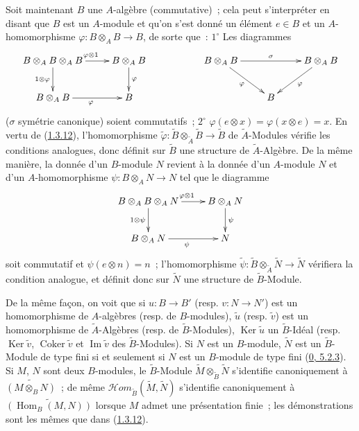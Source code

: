 \begin{env}[1.3.13]
\label{I.1.3.13-fr}
Soit maintenant $B$ une $A$-algèbre (commutative)~; cela peut s'interpréter
en disant que $B$ est un $A$-module et qu'on s'est donné un élément $e\in B$
et un $A$-homomorphisme
$\varphi:B\otimes_A B\to B$, de sorte que~: $1^\circ$ Les diagrammes
\[
  \xymatrix{
    B\otimes_A B\otimes_A B\ar[r]^{\varphi\otimes 1}
      \ar[d]_{1\otimes\varphi} &
    B\otimes_A B\ar[d]^\varphi & &
    B\otimes_A B\ar[rr]^\sigma\ar[rd]_\varphi & &
    B\otimes_A B\ar[dl]^\varphi\\
    B\otimes_A B\ar[r]_\varphi &
    B & & & B
  }
\]
($\sigma$ symétrie canonique) soient commutatifs~; $2^\circ$
$\varphi(e\otimes x)=\varphi(x\otimes e)=x$. En vertu de
(\hyperref[I.1.3.12-fr]{1.3.12}), l'homomorphisme
$\widetilde{\varphi}:\widetilde{B}\otimes_{\widetilde{A}}\widetilde{B}
\to\widetilde{B}$ de $\widetilde{A}$-Modules vérifie les conditions
analogues, donc définit sur $\widetilde{B}$ une structure de
$\widetilde{A}$-Algèbre. De la même manière, la donnée d'un $B$-module $N$
revient à la donnée d'un $A$-module $N$ et d'un $A$-homomorphisme
$\psi:B\otimes_A N\to N$ tel que le diagramme
\[
  \xymatrix{
    B\otimes_A B\otimes_A N\ar[r]^{\varphi\otimes 1}
      \ar[d]_{1\otimes\psi} &
    B\otimes_A N\ar[d]^\psi\\
    B\otimes_A N\ar[r]_\psi & N
  }
\]
soit commutatif et $\psi(e\otimes n)=n$~; l'homomorphisme
$\widetilde{\psi}:\widetilde{B}\otimes_{\widetilde{A}}\widetilde{N}
\to\widetilde{N}$ vérifiera la condition analogue, et définit donc sur
$\widetilde{N}$ une structure de $\widetilde{B}$-Module.

De la même façon, on voit que si $u:B\to B'$ (resp. $v:N\to N'$) est un
homomorphisme de $A$-algèbres (resp. de $B$-modules), $\widetilde{u}$
(resp. $\widetilde{v}$) est un homomorphisme de $\widetilde{A}$-Algèbres
(resp. de $\widetilde{B}$-Modules), $\operatorname{Ker}\widetilde{u}$ un
$\widetilde{B}$-Idéal (resp. $\operatorname{Ker}\widetilde{v}$,
$\operatorname{Coker}\widetilde{v}$ et $\operatorname{Im}\widetilde{v}$
des $\widetilde{B}$-Modules). Si $N$ est un $B$-module, $\widetilde{N}$ est
un $\widetilde{B}$-Module de type fini si et seulement si $N$ est un
$B$-module de type fini (\hyperref[0.5.2.3-fr]{0, 5.2.3}).
Si $M$, $N$ sont deux $B$-modules, le $\widetilde{B}$-Module
$\widetilde{M}\otimes_{\widetilde{B}}\widetilde{N}$ s'identifie
canoniquement à $\widetilde{(M\otimes_B N)}$~; de même
$\mathscr{H}\!om_{\widetilde{B}}(\widetilde{M},\widetilde{N})$ s'identifie
canoniquement à $\widetilde{(\operatorname{Hom}_B(M,N))}$ lorsque $M$ admet
une présentation finie~; les démonstrations sont les mêmes que dans
(\hyperref[I.1.3.12-fr]{1.3.12}).


\end{env}
